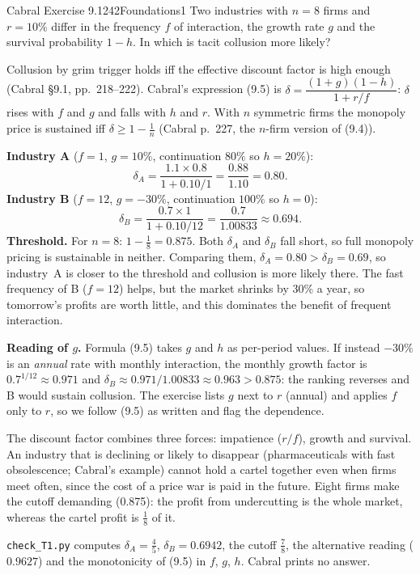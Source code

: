 \begin{exsol}{Cabral Exercise 9.1}{242}{Foundations}{1}
\asked Two industries with $n = 8$ firms and $r = 10\%$ differ in the frequency $f$ of interaction, the
growth rate $g$ and the survival probability $1 - h$. In which is tacit collusion more likely?

\method Collusion by grim trigger holds iff the effective discount factor is high enough
(Cabral \S9.1, pp.~218--222). Cabral's expression (9.5) is
$\delta = \dfrac{(1+g)(1-h)}{1 + r/f}$: $\delta$ rises with $f$ and $g$ and falls with $h$ and $r$. With
$n$ symmetric firms the monopoly price is sustained iff $\delta \ge 1 - \frac1n$ (Cabral p.~227, the
$n$-firm version of (9.4)).

\solution
\textbf{Industry A} ($f = 1$, $g = 10\%$, continuation $80\%$ so $h = 20\%$):
\[
  \delta_A = \frac{1.1 \times 0.8}{1 + 0.10/1} = \frac{0.88}{1.10} = 0.80 .
\]
\textbf{Industry B} ($f = 12$, $g = -30\%$, continuation $100\%$ so $h = 0$):
\[
  \delta_B = \frac{0.7 \times 1}{1 + 0.10/12} = \frac{0.7}{1.00833} \approx 0.694 .
\]
\textbf{Threshold.} For $n = 8$: $1 - \frac18 = 0.875$. Both $\delta_A$ and $\delta_B$ fall short, so full
monopoly pricing is sustainable in neither. Comparing them, $\delta_A = 0.80 > \delta_B = 0.69$, so
industry~A is closer to the threshold and collusion is more likely there. The fast frequency of B
($f = 12$) helps, but the market shrinks by 30\% a year, so tomorrow's profits are worth little, and this
dominates the benefit of frequent interaction.

\textbf{Reading of $g$.} Formula (9.5) takes $g$ and $h$ as per-period values. If instead $-30\%$ is an
\emph{annual} rate with monthly interaction, the monthly growth factor is $0.7^{1/12} \approx 0.971$ and
$\delta_B \approx 0.971/1.00833 \approx 0.963 > 0.875$: the ranking reverses and B would sustain
collusion. The exercise lists $g$ next to $r$ (annual) and applies $f$ only to $r$, so we follow (9.5)
as written and flag the dependence.

\interp The discount factor combines three forces: impatience ($r/f$), growth and survival. An
industry that is declining or likely to disappear (pharmaceuticals with fast obsolescence; Cabral's
example) cannot hold a cartel together even when firms meet often, since the cost of a price war is
paid in the future. Eight firms make the cutoff demanding (0.875): the profit from undercutting is
the whole market, whereas the cartel profit is $\frac18$ of it.

\verify \texttt{check\_T1.py} computes $\delta_A = \frac45$, $\delta_B = 0.6942$, the cutoff $\frac78$, the
alternative reading ($0.9627$) and the monotonicity of (9.5) in $f$, $g$, $h$. Cabral prints no answer.

\end{exsol}
